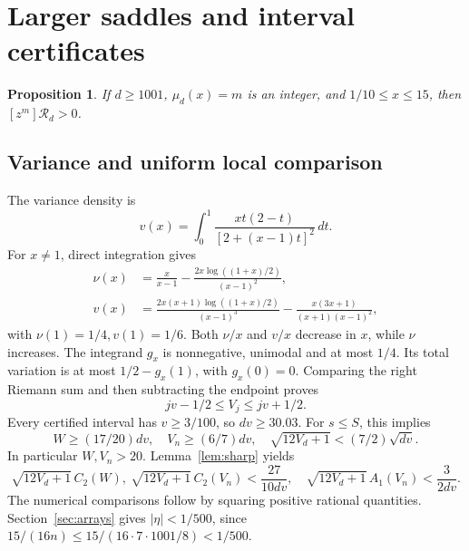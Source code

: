 \documentclass[11pt]{article}
\newtheorem{proposition}[theorem]{Proposition}
\theoremstyle{remark}\newtheorem{remark}[theorem]{Remark}
\newcommand{\Rpoly}{\mathcal R}
\newcommand{\dd}{\,dt}
\begin{document}
\section{Larger saddles and interval certificates}\label{sec:large}
\begin{proposition}\label{prop:large}
If $d\ge1001$, $\mu_d(x)=m$ is an integer, and $1/10\le x\le15$,
then $[z^m]\Rpoly_d>0$.
\end{proposition}
\subsection{Variance and uniform local comparison}
The variance density is
\[
 v(x)=\int_0^1\frac{xt(2-t)}{[2+(x-1)t]^2}\dd.
\]
For $x\ne1$, direct integration gives
\begin{align}
 \nu(x)&=\frac{x}{x-1}-\frac{2x\log((1+x)/2)}{(x-1)^2},\\
 v(x)&=\frac{2x(x+1)\log((1+x)/2)}{(x-1)^3}
                  -\frac{x(3x+1)}{(x+1)(x-1)^2},\label{eq:vclosed}
\end{align}
with $\nu(1)=1/4,v(1)=1/6$.
Both $\nu/x$ and $v/x$ decrease in $x$, while $\nu$ increases.
The integrand $g_x$ is nonnegative, unimodal and at most $1/4$.
Its total variation is at most $1/2-g_x(1)$, with $g_x(0)=0$.
Comparing the right Riemann sum and then subtracting the endpoint proves
\[
 jv-1/2\le V_j\le jv+1/2.
\]
Every certified interval has $v\ge3/100$, so $dv\ge30.03$.
For $s\le S$, this implies
\[
 W\ge(17/20)dv,\quad V_n\ge(6/7)dv,\quad
 \sqrt{12V_d+1}<(7/2)\sqrt{dv}.
\]
In particular $W,V_n>20$.
Lemma~\ref{lem:sharp} yields
\[
 \sqrt{12V_d+1}\,C_2(W),\
 \sqrt{12V_d+1}\,C_2(V_n)<\frac{27}{10dv},
 \quad
 \sqrt{12V_d+1}\,A_1(V_n)<\frac{3}{2dv}.
\]
The numerical comparisons follow by squaring positive rational quantities.
Section~\ref{sec:arrays} gives $|\eta|<1/500$, since
$15/(16n)\le15/(16\cdot7\cdot1001/8)<1/500$.
\end{document}
